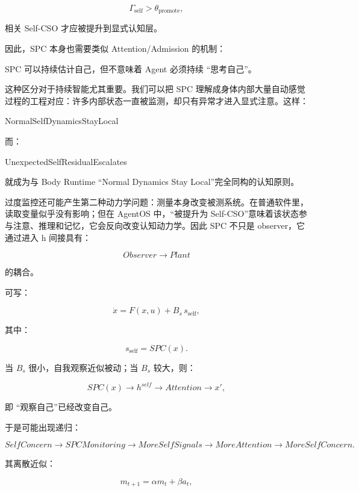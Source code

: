\[
\Gamma_{\mathrm{self}}
>
\theta_{\mathrm{promote}},
\]

相关 Self-CSO 才应被提升到显式认知层。

因此，SPC 本身也需要类似 Attention/Admission 的机制：

\begin{statementbox}
\centering
{}
\end{statementbox}

SPC 可以持续估计自己，但不意味着 Agent 必须持续 ``思考自己''。

这种区分对于持续智能尤其重要。我们可以把 SPC 理解成身体内部大量自动感觉过程的工程对应：许多内部状态一直被监测，却只有异常才进入显式注意。这样：

\begin{statementbox}
NormalSelfDynamicsStayLocal
\end{statementbox}

而：

\begin{statementbox}
UnexpectedSelfResidualEscalates
\end{statementbox}

就成为与 Body Runtime ``Normal Dynamics Stay Local''完全同构的认知原则。

过度监控还可能产生第二种动力学问题：测量本身改变被测系统。在普通软件里，读取变量似乎没有影响；但在 AgentOS 中，``被提升为 Self-CSO''意味着该状态参与注意、推理和记忆，它会反向改变认知动力学。因此 SPC 不只是 observer，它通过进入 h 间接具有：

\[
Observer\rightarrow Plant
\]

的耦合。

可写：

\[
\dot{x}
=
F(x,u)
+
B_s\,s_{\mathrm{self}},
\]

其中：

\[
s_{\mathrm{self}}
=
SPC(x).
\]

当 $B_s$ 很小，自我观察近似被动；当 $B_s$ 较大，则：

\[
SPC(x)
\rightarrow
h^{self}
\rightarrow
Attention
\rightarrow
x',
\]

即 ``观察自己''已经改变自己。

于是可能出现递归：

\[
SelfConcern
\rightarrow
SPCMonitoring
\rightarrow
MoreSelfSignals
\rightarrow
MoreAttention
\rightarrow
MoreSelfConcern.
\]

其离散近似：

\[
m_{t+1}
=
\alpha m_t
+
\beta a_t,
\]

